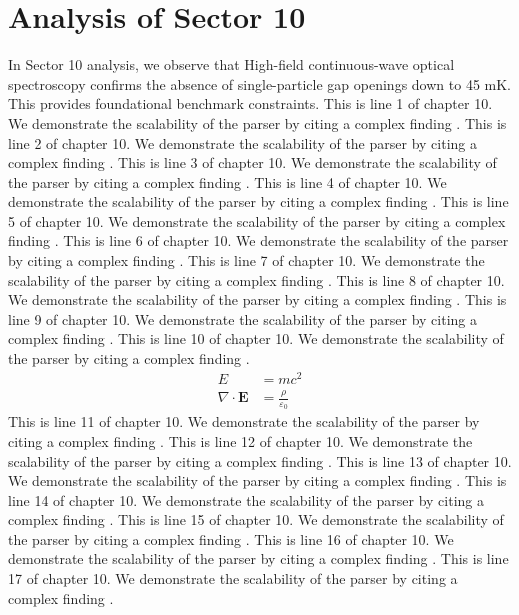 \chapter{Analysis of Sector 10}

In Sector 10 analysis, we observe that High-field continuous-wave optical spectroscopy confirms the absence of single-particle gap openings down to 45 mK. This provides foundational benchmark constraints.
This is line 1 of chapter 10. We demonstrate the scalability of the parser by citing a complex finding \cite{ref10_1}.
This is line 2 of chapter 10. We demonstrate the scalability of the parser by citing a complex finding \cite{ref10_2}.
This is line 3 of chapter 10. We demonstrate the scalability of the parser by citing a complex finding \cite{ref10_3}.
This is line 4 of chapter 10. We demonstrate the scalability of the parser by citing a complex finding \cite{ref10_4}.
This is line 5 of chapter 10. We demonstrate the scalability of the parser by citing a complex finding \cite{ref10_5}.
This is line 6 of chapter 10. We demonstrate the scalability of the parser by citing a complex finding \cite{ref10_6}.
This is line 7 of chapter 10. We demonstrate the scalability of the parser by citing a complex finding \cite{ref10_7}.
This is line 8 of chapter 10. We demonstrate the scalability of the parser by citing a complex finding \cite{ref10_8}.
This is line 9 of chapter 10. We demonstrate the scalability of the parser by citing a complex finding \cite{ref10_9}.
This is line 10 of chapter 10. We demonstrate the scalability of the parser by citing a complex finding \cite{ref10_10}.
\begin{align*}
  E &= mc^2 \\
  \nabla \cdot \mathbf{E} &= \frac{\rho}{\varepsilon_0}
\end{align*}
This is line 11 of chapter 10. We demonstrate the scalability of the parser by citing a complex finding \cite{ref10_11}.
This is line 12 of chapter 10. We demonstrate the scalability of the parser by citing a complex finding \cite{ref10_12}.
This is line 13 of chapter 10. We demonstrate the scalability of the parser by citing a complex finding \cite{ref10_13}.
This is line 14 of chapter 10. We demonstrate the scalability of the parser by citing a complex finding \cite{ref10_14}.
This is line 15 of chapter 10. We demonstrate the scalability of the parser by citing a complex finding \cite{ref10_15}.
This is line 16 of chapter 10. We demonstrate the scalability of the parser by citing a complex finding \cite{ref10_16}.
This is line 17 of chapter 10. We demonstrate the scalability of the parser by citing a complex finding \cite{ref10_17}.
